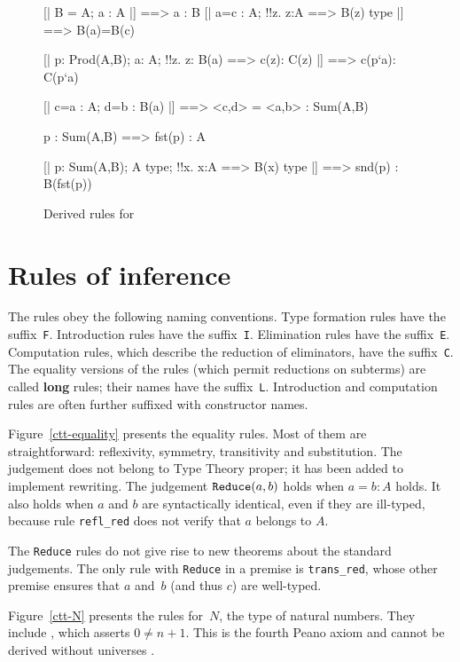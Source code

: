 \begin{figure} 
\begin{ttbox}
    [| B = A;  a : A |] ==> a : B
  [| a=c : A;  !!z. z:A ==> B(z) type |] ==> B(a)=B(c)

     [| p: Prod(A,B);  a: A;  !!z. z: B(a) ==> c(z): C(z)
                |] ==> c(p`a): C(p`a)

    [| c=a : A;  d=b : B(a) |] ==> <c,d> = <a,b> : Sum(A,B)

  p : Sum(A,B) ==> fst(p) : A

  [| p: Sum(A,B);  A type;  !!x. x:A ==> B(x) type
          |] ==> snd(p) : B(fst(p))
\end{ttbox}

\caption{Derived rules for {\CTT}} \label{ctt-derived}
\end{figure}


\section{Rules of inference}
The rules obey the following naming conventions.  Type formation rules have
the suffix~{\tt F}\@.  Introduction rules have the suffix~{\tt I}\@.
Elimination rules have the suffix~{\tt E}\@.  Computation rules, which
describe the reduction of eliminators, have the suffix~{\tt C}\@.  The
equality versions of the rules (which permit reductions on subterms) are
called {\bf long} rules; their names have the suffix~{\tt L}\@.
Introduction and computation rules are often further suffixed with
constructor names.

Figure~\ref{ctt-equality} presents the equality rules.  Most of them are
straightforward: reflexivity, symmetry, transitivity and substitution.  The
judgement  does not belong to Type Theory proper; it has
been added to implement rewriting.  The judgement ${\tt Reduce}(a,b)$ holds
when $a=b:A$ holds.  It also holds when $a$ and $b$ are syntactically
identical, even if they are ill-typed, because rule {\tt refl_red} does
not verify that $a$ belongs to $A$.  

The {\tt Reduce} rules do not give rise to new theorems about the standard
judgements.  The only rule with {\tt Reduce} in a premise is
{\tt trans_red}, whose other premise ensures that $a$ and~$b$ (and thus
$c$) are well-typed.

Figure~\ref{ctt-N} presents the rules for~$N$, the type of natural numbers.
They include , which asserts $0\not=n+1$.  This is
the fourth Peano axiom and cannot be derived without universes \cite[page
91]{martinlof84}.  

